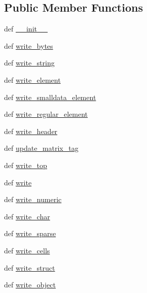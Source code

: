 \subsection*{Public Member Functions}
\begin{DoxyCompactItemize}
\item 
def \hyperlink{classscipy_1_1io_1_1matlab_1_1mio5_1_1VarWriter5_aca8cbbe73626b27df4eb21552d08d763}{\+\_\+\+\_\+init\+\_\+\+\_\+}
\item 
def \hyperlink{classscipy_1_1io_1_1matlab_1_1mio5_1_1VarWriter5_adbd868be7661dd737848391d9ab4e635}{write\+\_\+bytes}
\item 
def \hyperlink{classscipy_1_1io_1_1matlab_1_1mio5_1_1VarWriter5_a789c6297341ad9bec988f4b3315f5431}{write\+\_\+string}
\item 
def \hyperlink{classscipy_1_1io_1_1matlab_1_1mio5_1_1VarWriter5_a16d5d17ce6dbcf2303d915012fa1eed0}{write\+\_\+element}
\item 
def \hyperlink{classscipy_1_1io_1_1matlab_1_1mio5_1_1VarWriter5_ae7c01c9bd6afd227356bb04ec098f8f7}{write\+\_\+smalldata\+\_\+element}
\item 
def \hyperlink{classscipy_1_1io_1_1matlab_1_1mio5_1_1VarWriter5_ae1713e88658d1c30a84ba33d9f69aed5}{write\+\_\+regular\+\_\+element}
\item 
def \hyperlink{classscipy_1_1io_1_1matlab_1_1mio5_1_1VarWriter5_ab03b4b46c4b8cebee0a530bfb80fc937}{write\+\_\+header}
\item 
def \hyperlink{classscipy_1_1io_1_1matlab_1_1mio5_1_1VarWriter5_a32084b061750cf41e4da4d6e224f3f11}{update\+\_\+matrix\+\_\+tag}
\item 
def \hyperlink{classscipy_1_1io_1_1matlab_1_1mio5_1_1VarWriter5_aec2bfe6b5941022ac4fecd2c0f1d6d91}{write\+\_\+top}
\item 
def \hyperlink{classscipy_1_1io_1_1matlab_1_1mio5_1_1VarWriter5_a254cb18944052094301280d3b97a06a7}{write}
\item 
def \hyperlink{classscipy_1_1io_1_1matlab_1_1mio5_1_1VarWriter5_ad7141e6f1cc475efce0ecd7fa5b61572}{write\+\_\+numeric}
\item 
def \hyperlink{classscipy_1_1io_1_1matlab_1_1mio5_1_1VarWriter5_a57e1d58eb582ea4d415e73b5262b688f}{write\+\_\+char}
\item 
def \hyperlink{classscipy_1_1io_1_1matlab_1_1mio5_1_1VarWriter5_acd8d1cf2fb1ed4847506a62b3eb95647}{write\+\_\+sparse}
\item 
def \hyperlink{classscipy_1_1io_1_1matlab_1_1mio5_1_1VarWriter5_a178ea94c560c9146967c75003657bd10}{write\+\_\+cells}
\item 
def \hyperlink{classscipy_1_1io_1_1matlab_1_1mio5_1_1VarWriter5_a612a8896903594cc614f5a09d2d690ba}{write\+\_\+struct}
\item 
def \hyperlink{classscipy_1_1io_1_1matlab_1_1mio5_1_1VarWriter5_a1e9033c4fdd1a3e5868f5d0892914012}{write\+\_\+object}
\end{DoxyCompactItemize}
